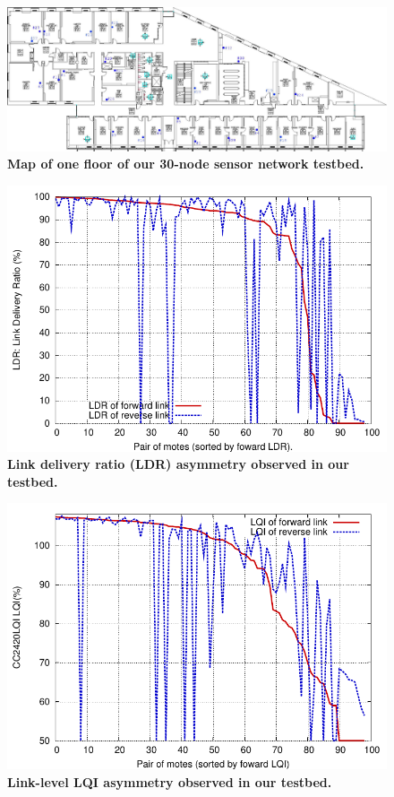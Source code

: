 \begin{figure}[t]
\begin{center}
\includegraphics[width=0.9\hsize]{resources/tinyadmr-techrept05/figures/maps/MD-2.pdf}
\end{center}
\caption{{\small {\bf Map of one floor of our 30-node sensor network testbed.}}}
\label{fig-motelab}
\end{figure}

\begin{figure}[t]
\begin{center}
\includegraphics[width=0.6\hsize]{resources/tinyadmr-techrept05/figures/lessons/lqi/link_asymmetry_dr.pdf}
\end{center}
\caption{{\small {\bf Link delivery ratio (LDR) asymmetry observed in
our testbed.}}}
\label{fig-link-asymmetry-dr}
\end{figure}

\begin{figure}[t]
\begin{center}
\includegraphics[width=0.6\hsize]{resources/tinyadmr-techrept05/figures/lessons/lqi/link_asymmetry_lqi.pdf}
\end{center}
\caption{{\small {\bf Link-level LQI asymmetry observed in our testbed.}}}
\label{fig-link-asymmetry-lqi}
\end{figure}

